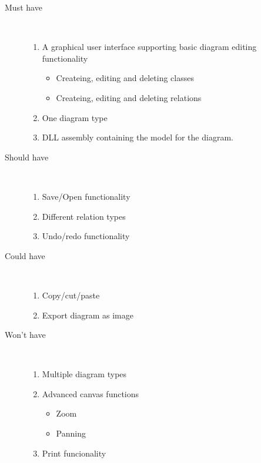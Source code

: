 \begin{description}
	\item[Must have] \hfill \\
	\begin{enumerate}
		\item A graphical user interface supporting basic diagram editing 
		functionality
		\begin{itemize}
			\item Createing, editing and deleting classes
			\item Createing, editing and deleting relations
		\end{itemize}
		\item One diagram type
		\item DLL assembly containing the model for the diagram.
	\end{enumerate}
	\item[Should have] \hfill \\
	\begin{enumerate}
		\item Save/Open functionality
		\item Different relation types
		\item Undo/redo functionality
	\end{enumerate}
	\item[Could have] \hfill \\
	\begin{enumerate}
		\item Copy/cut/paste
		\item Export diagram as image
	\end{enumerate}
	\item[Won't have] \hfill \\
	\begin{enumerate}
		\item Multiple diagram types
		\item Advanced canvas functions
		\begin{itemize}
			\item Zoom
			\item Panning
		\end{itemize}
		\item Print funcionality
	\end{enumerate}
\end{description}





